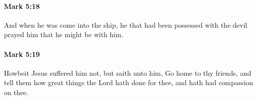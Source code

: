 		\paragraph{Mark 5:18} %
			\label{MARK-5-18}

			And when he was come into the ship, he that had been possessed with the devil prayed him that he might be with him.

			\begin{framed}
			\scriptsize
				\begin{compactdesc}
					\item[SBLG] 
				\end{compactdesc}
			\end{framed}

		\paragraph{Mark 5:19} %
			\label{MARK-5-19}

			Howbeit Jesus suffered him not, but saith unto him, Go home to thy friends, and tell them how great things the Lord hath done for thee, and hath had compassion on thee.

